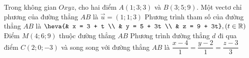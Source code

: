 \begin{ex}%
	Trong không gian $Oxyz$, cho  hai điểm $A(1; 3; 3)$ và $B(3; 5; 9)$.
	 \choiceTF
		{\True Một vectơ chỉ phương của đường thẳng $AB$  là $\overrightarrow{u} = (1; 1; 3)$}
		{Phương trình tham số của đường thẳng $AB$ là $\heva{& x = 3 + t \\ & y = 5 +  3t \\ & z = 9 + 3t}, (t \in \mathbb{R})$}
		{Điểm $M(4;6;9)$ thuộc  đường thẳng $AB$}
		{\True Phương trình đường thẳng $d$ đi qua điểm $C(2; 0; -3)$ và song song với  đường thẳng $AB$ là $\dfrac{x-4}{1} = \dfrac{y-2}{1} = \dfrac{z-3}{3}$}
\end{ex}

